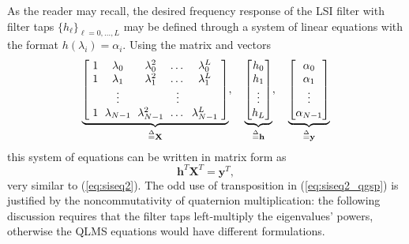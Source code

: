 As the reader may recall, the desired frequency response of the LSI filter with filter taps $\{h_\ell\}_{\ell=0,\dots, L}$ may be defined through a system of linear equations with the format $h(\lambda_i) = \alpha_i$. Using the matrix and vectors
\begin{align}
    \label{eq:siseq2_qgsp_aux}
    \setlength{\arraycolsep}{3pt}
    \underbrace{
        \left[
            \begin{array}{ccccc}
                1 & \lambda_0     & \lambda^2_0     & \dots  & \lambda^L_0     \\
                1 & \lambda_1     & \lambda^2_1     & \dots  & \lambda^L_1     \\
                  & \vdots        &                 & \vdots &                 \\
                1 & \lambda_{N-1} & \lambda^2_{N-1} & \dots  & \lambda^L_{N-1} \\
            \end{array}\right]
    }_{\overset{\Delta}{=} \mathbf{X}}, \quad
    \underbrace{
        \begin{bmatrix}
            h_0    \\
            h_1    \\
            \vdots \\
            h_L
        \end{bmatrix}
    }_{\overset{\Delta}{=} \mathbf{h}}, \quad
    \underbrace{
        \begin{bmatrix}
            \alpha_0 \\
            \alpha_1 \\
            \vdots   \\
            \alpha_{N-1}
        \end{bmatrix}
    }_{\overset{\Delta}{=} \mathbf{y}}
\end{align}
this system of equations can be written in matrix form as
\begin{equation}
    \label{eq:siseq2_qgsp}
    \mathbf{h}^T \mathbf{X}^T = \mathbf{y}^T,
\end{equation}
very similar to (\ref{eq:siseq2}). The odd use of transposition in (\ref{eq:siseq2_qgsp}) is justified by the noncommutativity of quaternion multiplication: the following discussion requires that the filter taps left-multiply the eigenvalues' powers, otherwise the QLMS equations would have different formulations.

